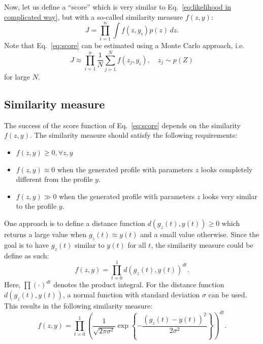 \documentclass[10pt,final,a4paper,oneside,onecolumn]{article}
\theoremstyle{plain}\newtheorem{definition}{Definition}[section]    %
\theoremstyle{definition}\newtheorem{example}{Example}[section]     %
\theoremstyle{remark}\newtheorem{remarkenv}{Remark}[section]        %
\begin{document}
Now, let us define a ``score'' which is very similar to Eq.~\eqref{eq:likelihood in complicated way}, but with a so-called similarity measure $f(z,y)$:
\begin{equation} \label{eq:score}
	J = \prod_{i=1}^n \int f(z,y_i)p(z) \,dz.
\end{equation}
Note that Eq.~\eqref{eq:score} can be estimated using a Monte Carlo approach, i.e.
\begin{equation} \label{eq:score monte carlo}
	J \approx \prod_{i=1}^n \frac{1}{N} \sum_{j=1}^N f(z_j, y_i), \quad z_j \sim p(Z)
\end{equation}
for large $N$.

\subsection{Similarity measure}
\label{sec:method similarity function}

The success of the score function of Eq.~\eqref{eq:score} depends on the similarity $f(z,y)$. The similarity measure should satisfy the following requirements:
\begin{itemize}
	\item $f(z,y) \geq 0, \forall z, y$
	\item $f(z,y) \approx 0$ when the generated profile with parameters $z$ looks completely different from the profile $y$.
	\item $f(z,y) \gg 0$ when the generated profile with parameters $z$ looks very similar to the profile $y$.
\end{itemize}

One approach is to define a distance function $d(g_z(t), y(t)) \geq 0$ which returns a large value when $g_z(t) \approx y(t)$ and a small value otherwise. Since the goal is to have $g_z(t)$ similar to $y(t)$ for all $t$, the similarity measure could be define as such:
\begin{equation}
	f(z,y) = \prod_{t=0}^{1} d(g_z(t), y(t))^{dt}.
\end{equation}
Here, $\prod (\cdot)^{dt}$ denotes the product integral. For the distance function $d(g_z(t), y(t))$, a normal function with standard deviation $\sigma$ can be used. This results in the following similarity measure:
\begin{equation} \label{eq:similarity measure normal function}
	f(z,y) = \prod_{t=0}^{1} \left( \frac{1}{\sqrt{2\pi\sigma^2}} \exp \left\{ -\frac{(g_z(t)-y(t))^2}{2\sigma^2} \right\} \right)^{dt}.
\end{equation}
\end{document}
